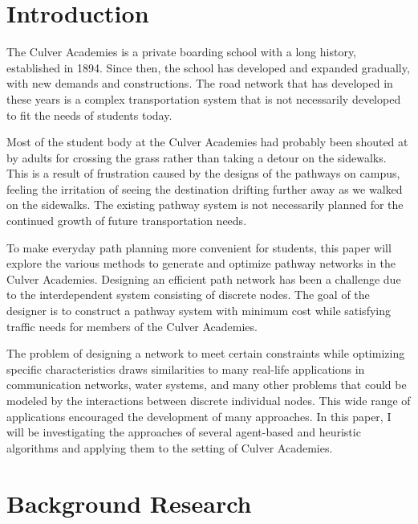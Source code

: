 \documentclass[11pt]{article}
\begin{document}
\section{Introduction}
The Culver Academies is a private boarding school with a long history, established in 1894. Since then, the school has developed and expanded gradually, with new demands and constructions. The road network that has developed in these years is a complex transportation system that is not necessarily developed to fit the needs of students today. \par
Most of the student body at the Culver Academies had probably been shouted at by adults for crossing the grass rather than taking a detour on the sidewalks. This is a result of frustration caused by the designs of the pathways on campus, feeling the irritation of seeing the destination drifting further away as we walked on the sidewalks. The existing pathway system is not necessarily planned for the continued growth of future transportation needs.\par
To make everyday path planning more convenient for students, this paper will explore the various methods to generate and optimize pathway networks in the Culver Academies. Designing an efficient path network has been a challenge due to the interdependent system consisting of discrete nodes. The goal of the designer is to construct a pathway system with minimum cost while satisfying traffic needs for members of the Culver Academies. \par
The problem of designing a network to meet certain constraints while optimizing specific characteristics draws similarities to many real-life applications in communication networks, water systems, and many other problems that could be modeled by the interactions between discrete individual nodes. This wide range of applications encouraged the development of many approaches. In this paper, I will be investigating the approaches of several agent-based and heuristic algorithms and applying them to the setting of Culver Academies. \par
\section{Background Research}
\end{document}
